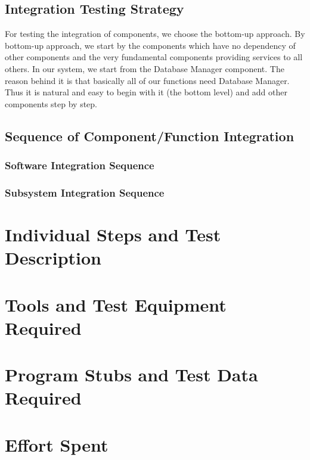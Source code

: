 \documentclass{article}
\begin{document}
 \subsection{Integration Testing Strategy}
 For testing the integration of components, we choose the bottom-up approach. By bottom-up approach, we start by the components which have no dependency of other components and the very fundamental components providing services to all others. In our system, we start from the Database Manager component. The reason behind it is that basically all of our functions need Database Manager. Thus it is natural and easy to begin with it (the bottom level) and add other components step by step. 
 \subsection{Sequence of Component/Function Integration}
  \subsubsection{Software Integration Sequence}
  \subsubsection{Subsystem Integration Sequence}
  
\newpage

\section{Individual Steps and Test Description}

\newpage

\section{Tools and Test Equipment Required}

\newpage
\section{Program Stubs and Test Data Required}

\newpage
\section{Effort Spent}
\end{document}
